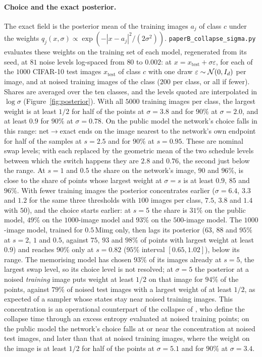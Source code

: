 \documentclass{article} %
\theoremstyle{plain}
\theoremstyle{definition}
\theoremstyle{remark}
\begin{document}
\paragraph{Choice and the exact posterior.} The exact field is the posterior mean of the training
images $a_j$ of class $c$ under the weights $q_j(x,\sigma)\propto\exp(-|x-a_j|^2/(2\sigma^2))$.
\texttt{paperB\_collapse\_sigma.py} evaluates these weights on the training set of each model,
regenerated from its seed, at $81$ noise levels log-spaced from $80$ to $0.002$: at
$x=x_{\mathrm{test}}+\sigma\varepsilon$, for each of the $1000$ CIFAR-10 test images
$x_{\mathrm{test}}$ of class $c$ with one draw $\varepsilon\sim\mathcal{N}(0,I_d)$ per image, and at noised
training images of the class ($200$ per class, or all if fewer). Shares are averaged over the ten
classes, and the levels quoted are interpolated in $\log\sigma$ (Figure~\ref{fig:posterior}). With
all $5000$ training images per class, the largest weight is at least $1/2$ for half of the points
at $\sigma=3.8$ and for $90\%$ at $\sigma=2.0$, and at least $0.9$ for $90\%$ at $\sigma=0.78$. On
the public model the network's choice falls in this range: net$\to$exact ends on the image
nearest to the network's own endpoint for half of the samples at $s=2.5$ and for $90\%$ at
$s=0.95$. These are nominal swap levels; with each replaced by the geometric mean of the two
schedule levels between which the switch happens they are $2.8$ and $0.76$, the second just below
the range. At $s=1$ and $0.5$ the share on the network's image, $90$ and $96\%$, is close to the
share of points whose largest weight at $\sigma=s$ is at least $0.9$, $85$ and $96\%$. With fewer
training images the posterior concentrates earlier ($\sigma=6.4$, $3.3$ and $1.2$ for the same
three thresholds with $100$ images per class, $7.5$, $3.8$ and $1.4$ with $50$), and the choice
starts earlier: at $s=5$ the share is $31\%$ on the public model, $49\%$ on the $1000$-image
model and $93\%$ on the $500$-image model. The $1000$-image model, trained for $0.5$\,Mimg only,
then lags its posterior ($63$, $88$ and $95\%$ at $s=2$, $1$ and $0.5$, against $75$, $93$ and
$98\%$ of points with largest weight at least $0.9$) and reaches $90\%$ only at $s=0.82$ ($95\%$
interval $[0.65,1.02]$), below its range. The memorising model has chosen $93\%$ of its images
already at $s=5$, the largest swap level, so its choice level is not resolved; at $\sigma=5$ the
posterior at a noised \emph{training} image puts weight at least $1/2$ on that image for $94\%$ of
the points, against $79\%$ of noised test images with a largest weight of at least $1/2$, as
expected of a sampler whose states stay near noised training images. This concentration is an
operational counterpart of the collapse of \citet{biroli2024dynamical}, who define the collapse
time through an excess entropy evaluated at noised training points; on the public model the
network's choice falls at or near the concentration at noised test images, and later than that at
noised training images, where the weight on the image is at least $1/2$ for half of the points at
$\sigma=5.1$ and for $90\%$ at $\sigma=3.4$.
\end{document}
